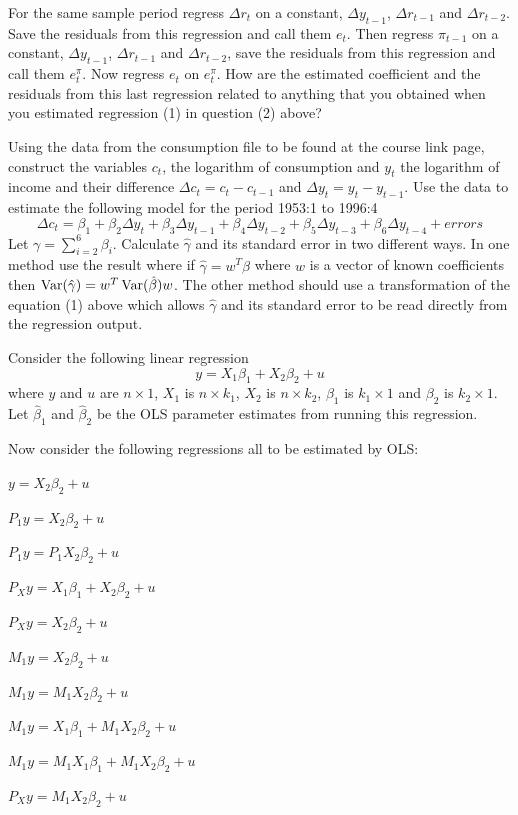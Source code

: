 \documentclass[11pt]{article}
\begin{document}
For the same sample period regress $\Delta r_{t}$ on a constant,
$\Delta y_{t-1}$, $\Delta r_{t-1}$ and $\Delta r_{t-2}$. Save the residuals from
this regression and call them $e_{t}$. Then regress $\pi_{t-1}$ on a constant,
$\Delta y_{t-1}$, $\Delta r_{t-1}$ and $\Delta r_{t-2}$, save the residuals from
this regression and call them $e_{t}^{\pi}$. Now regress $e_{t}$ on
$e_{t}^{\pi}$. How are the estimated coefficient and the residuals from this last
regression related to anything that you obtained when you estimated regression
(1) in question (2) above?

Using the data from the consumption file to be found at the course link page,
construct the variables $c_{t}$, the logarithm of consumption and $y_{t}$ the
logarithm of income and their difference $\Delta c_{t} = c_{t} - c_{t-1}$ and
$\Delta y_{t} = y_{t} - y_{t-1}$. Use the data to estimate the following model
for the period 1953:1 to 1996:4
\begin{equation}\tag{2}
  \Delta c_{t} = \beta_{1} + \beta_{2}\Delta y_{t}
                 + \beta_{3}\Delta y_{t-1} + \beta_{4}\Delta y_{t-2}
                 + \beta_{5}\Delta y_{t-3} + \beta_{6}\Delta y_{t-4}
                 + errors
\end{equation}
Let $\gamma = \sum_{i=2}^{6}\beta_{i}$. Calculate $\hat{\gamma}$ and its standard
error in two different ways. In one method use the result where if
$\hat{\gamma} = w^{T}\hat{\beta}$ where $w$ is a vector of known coefficients
then $\operatorname{Var}(\hat{\gamma}) = w^{T}\operatorname{Var}(\hat{\beta})w$. The other method should use
a transformation of the equation (1) above which allows $\hat{\gamma}$ and its
standard error to be read directly from the regression output.

Consider the following linear regression
\[
  y = X_{1}\beta_{1} + X_{2}\beta_{2} + u
\]
where $y$ and $u$ are $n \times 1$, $X_{1}$ is $n \times k_{1}$, $X_{2}$ is
$n \times k_{2}$, $\beta_{1}$ is $k_{1} \times 1$ and $\beta_{2}$ is
$k_{2} \times 1$. Let $\hat{\beta}_{1}$ and $\hat{\beta}_{2}$ be the OLS
parameter estimates from running this regression.

Now consider the following regressions all to be estimated by OLS:

\begin{flatlist}
  \item[(a)] $y = X_{2}\beta_{2} + u$
  \item[(b)] $P_{1}y = X_{2}\beta_{2} + u$
  \item[(c)] $P_{1}y = P_{1}X_{2}\beta_{2} + u$
  \item[(d)] $P_{X}y = X_{1}\beta_{1} + X_{2}\beta_{2} + u$
  \item[(e)] $P_{X}y = X_{2}\beta_{2} + u$
  \item[(f)] $M_{1}y = X_{2}\beta_{2} + u$
  \item[(g)] $M_{1}y = M_{1}X_{2}\beta_{2} + u$
  \item[(h)] $M_{1}y = X_{1}\beta_{1} + M_{1}X_{2}\beta_{2} + u$
  \item[(i)] $M_{1}y = M_{1}X_{1}\beta_{1} + M_{1}X_{2}\beta_{2} + u$
  \item[(j)] $P_{X}y = M_{1}X_{2}\beta_{2} + u$
\end{flatlist}
\end{document}
